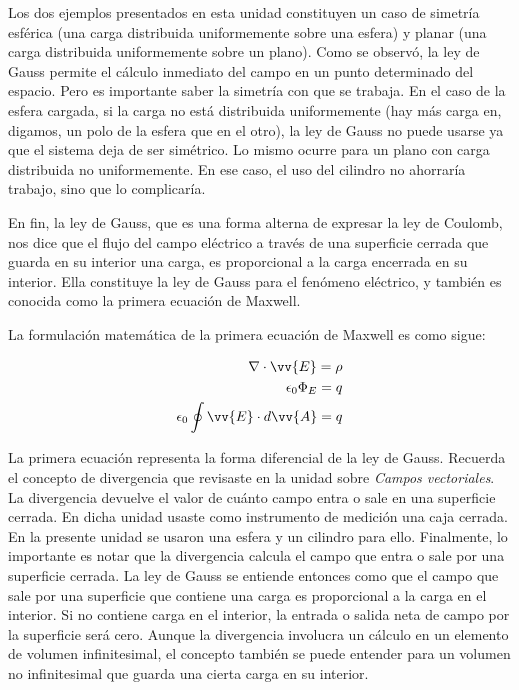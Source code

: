 \documentclass{article}
\begin{document}
Los dos ejemplos presentados en esta unidad constituyen un caso de simetría esférica (una carga distribuida uniformemente sobre una esfera) y planar (una carga distribuida uniformemente sobre un plano). Como se observó, la ley de Gauss permite el cálculo inmediato del campo en un punto determinado del espacio.
Pero es importante saber la simetría con que se trabaja. En el caso de la esfera cargada, si la carga no está distribuida uniformemente (hay más carga en, digamos, un polo de la esfera que en el otro), la ley de Gauss no puede usarse ya que el sistema deja de ser simétrico. Lo mismo ocurre para un plano con carga distribuida no uniformemente. En ese caso, el uso del cilindro no ahorraría trabajo, sino que lo complicaría.\bigskip

En fin, la ley de Gauss, que es una forma alterna de expresar la ley de Coulomb, nos dice que el flujo del campo eléctrico a través de una superficie cerrada que guarda en su interior una carga, es proporcional a la carga encerrada en su interior. Ella constituye la ley de Gauss para el fenómeno eléctrico, y también es conocida como la primera ecuación de Maxwell.\bigskip

La formulación matemática de la primera ecuación de Maxwell es como sigue:\bigskip

\begin{equation}
\begin{aligned}
\nabla\cdot{\vv{E}}=\rho\\
\epsilon_0\Phi_E=q\\
\epsilon_0\oint\vv{E}\cdot{d}\vv{A}=q
\end{aligned}
\end{equation}\bigskip

La primera ecuación representa la forma diferencial de la ley de Gauss. Recuerda el concepto de divergencia que revisaste en la unidad sobre \emph{Campos vectoriales}. La divergencia devuelve el valor de cuánto campo entra o sale en una superficie cerrada. En dicha unidad usaste como instrumento de medición una caja cerrada. En la presente unidad se usaron una esfera y un cilindro para ello. Finalmente, lo importante es notar que la divergencia calcula el campo que entra o sale por una superficie cerrada. La ley de Gauss se entiende entonces como que el campo que sale por una superficie que contiene una carga es proporcional a la carga en el interior. Si no contiene carga en el interior, la entrada o salida neta de campo por la superficie será cero. Aunque la divergencia involucra un cálculo en un elemento de volumen infinitesimal, el concepto también se puede entender para un volumen no infinitesimal que guarda una cierta carga en su interior.\bigskip
\end{document}

